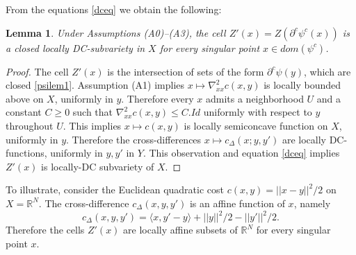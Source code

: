 \documentclass[12pt]{amsart}
\newtheorem{lem}{Lemma}
\theoremstyle{definition}
\theoremstyle{remark}
\newcommand{\bR}{\mathbb{R}}
\newcommand{\del}{\partial}
\newcommand{\cd}{c_\Delta}
\begin{document}
From the equations \eqref{dceq} we obtain the following:
\begin{lem}\label{ldc} 
Under Assumptions (A0)--(A3), the cell $Z'(x)=Z(\del^c \psi^c(x))$ is a closed locally DC-subvariety in $X$ for every singular point $x\in dom(\psi^c)$. 
\end{lem}
\begin{proof}
The cell $Z'(x)$ is the intersection of sets of the form $\del^c \psi(y)$, which are closed \ref{psilem1}. Assumption (A1) implies $x\mapsto \nabla^2_{xx} c(x,y)$ is locally bounded above on $X$, uniformly in $y$. Therefore every $x$ admits a neighborhood $U$ and a constant $C\geq 0$ such that $\nabla_{xx}^2 c(x,y) \leq C.Id$ uniformly with respect to $y$ throughout $U$. This implies $x\mapsto c(x,y)$ is locally semiconcave function on $X$, uniformly in $y$. Therefore the cross-differences $x \mapsto \cd(x;y,y')$ are locally DC-functions, uniformly in $y,y'$ in $Y$. This observation and equation \eqref{dceq} implies $Z'(x)$ is locally-DC subvariety of $X$.  
\end{proof}

To illustrate, consider the Euclidean quadratic cost $c(x,y)=||x-y||^2/2$ on $X=\bR^N$. The cross-difference $\cd(x,y,y')$ is an affine function of $x$, namely $$\cd(x,y,y')=\langle x, y'-y\rangle + ||y||^2/2-||y'||^2/2.$$ Therefore the cells $Z'(x)$ are locally affine subsets of $\bR^N$ for every singular point $x$. 




\end{document}
